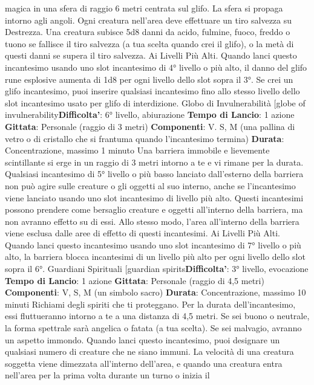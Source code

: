 \begin{multicols}{2}
magica in una sfera di raggio 6 metri centrata sul glifo.
La sfera si propaga intorno agli angoli. Ogni creatura
nell’area deve effettuare un tiro salvezza su Destrezza.
Una creatura subisce 5d8 danni da acido, fulmine,
fuoco, freddo o tuono se fallisce il tiro salvezza (a tua
scelta quando crei il glifo), o la metà di questi danni se
supera il tiro salvezza.
Ai Livelli Più Alti. Quando lanci questo incantesimo
usando uno slot incantesimo di 4° livello o più alto, il
danno del glifo rune esplosive aumenta di 1d8 per ogni
livello dello slot sopra il 3°. Se crei un glifo incantesimo,
puoi inserire qualsiasi incantesimo fino allo stesso
livello dello slot incantesimo usato per glifo di
interdizione.
Globo di Invulnerabilità
[globe of invulnerability\textbf{Difficolta'}:
6° livello, abiurazione
\textbf{Tempo di Lancio}: 1 azione
\textbf{Gittata}: Personale (raggio di 3 metri)
\textbf{Componenti}: V. S, M (una pallina di vetro o di cristallo
che si frantuma quando l’incantesimo termina)
\textbf{Durata}: Concentrazione, massimo 1 minuto
Una barriera immobile e lievemente scintillante si erge
in un raggio di 3 metri intorno a te e vi rimane per la
durata.
Qualsiasi incantesimo di 5° livello o più basso lanciato
dall’esterno della barriera non può agire sulle creature o
gli oggetti al suo interno, anche se l’incantesimo viene
lanciato usando uno slot incantesimo di livello più alto.
Questi incantesimi possono prendere come bersaglio
creature e oggetti all’interno della barriera, ma non
avranno effetto su di essi. Allo stesso modo, l’area
all’interno della barriera viene esclusa dalle aree di
effetto di questi incantesimi.
Ai Livelli Più Alti. Quando lanci questo incantesimo
usando uno slot incantesimo di 7° livello o più alto, la
barriera blocca incantesimi di un livello più alto per ogni
livello dello slot sopra il 6°.
Guardiani Spirituali
[guardian spirits\textbf{Difficolta'}:
3° livello, evocazione
\textbf{Tempo di Lancio}: 1 azione
\textbf{Gittata}: Personale (raggio di 4,5 metri)
\textbf{Componenti}: V, S, M (un simbolo sacro)
\textbf{Durata}: Concentrazione, massimo 10 minuti
Richiami degli spiriti che ti proteggano. Per la durata
dell’incantesimo, essi fluttueranno intorno a te a una
distanza di 4,5 metri. Se sei buono o neutrale, la forma
spettrale sarà angelica o fatata (a tua scelta). Se sei
malvagio, avranno un aspetto immondo.
Quando lanci questo incantesimo, puoi designare un
qualsiasi numero di creature che ne siano immuni. La
velocità di una creatura soggetta viene dimezzata
all’interno dell’area, e quando una creatura entra
nell’area per la prima volta durante un turno o inizia il

\end{multicols}
